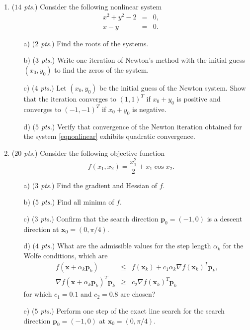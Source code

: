\documentclass[a4paper,11pt]{article}
\begin{document}
\begin{enumerate}


\item (\textit{$14$ pts.})  Consider the following nonlinear system
    \begin{subequations}\label{eqnonlinear}
    \begin{eqnarray}
        x^2 + y^2 -2 &=&0 , \\
        x- y &=& 0.
    \end{eqnarray}
    \end{subequations}
    \begin{itemize}
	   \item[a)] (\textit{$2$ pts.})  Find the roots of the systems.
	   \item[b)] (\textit{$3$ pts.})  Write one iteration of Newton's method with the initial guess $(x_{0},y_0)$ to find the zeros of the system.
	   \item[c)] (\textit{$4$ pts.})  Let $(x_{0},y_0)$  be the initial guess of the Newton system. Show that the iteration converges to $(1,1)^T$ if $x_{0}+y_{0}$ is positive and converges to
                                      $(-1,-1)^T$ if $x_{0}	+y_{0}$ is negative.
	   \item[d)] (\textit{$5$ pts.})  Verify that  convergence of the Newton iteration obtained for the system  \eqref{eqnonlinear} exhibits quadratic convergence.
    \end{itemize}



\item (\textit{$20$ pts.}) Consider the following objective function
    \[
        f(x_1,x_2) = \frac{x_1^2}{2} + x_1\cos x_2.
     \]
    \begin{itemize}
        \item[a)] (\textit{$3$ pts.}) Find the gradient and Hessian of  $f$.
        \item[b)] (\textit{$5$ pts.}) Find all minima of  $f$.
        \item[c)] (\textit{$3$ pts.}) Confirm that the search direction ${\mathbf p}_0 = (-1,0)$ is a descent direction at ${\mathbf x}_0 = (0, \pi/4)$.
        \item[d)] (\textit{$4$ pts.}) What are the admissible values for the step length  $\alpha_k$ for the Wolfe conditions, which are
            \begin{eqnarray*}
                f({\mathbf x} +\alpha_k {\mathbf p}_k ) & \le & f({\mathbf x}_k) + c_1 \alpha_k \nabla f({\mathbf x}_k)^T {\mathbf p}_k, \\
                \nabla f({\mathbf x} + \alpha_k {\mathbf p}_k)^T{\mathbf p}_k & \ge & c_2 \nabla f({\mathbf x}_k)^T {\mathbf p}_k
            \end{eqnarray*}
            for which $c_1 = 0.1$ and $c_2=0.8$ are chosen?
        \item[e)] (\textit{$5$ pts.}) Perform one step of the exact line search for the search direction ${\mathbf p}_0 = (-1,0)$  at ${\mathbf x}_0 = (0, \pi/4)$.
    \end{itemize}


\end{enumerate}
\end{document}
